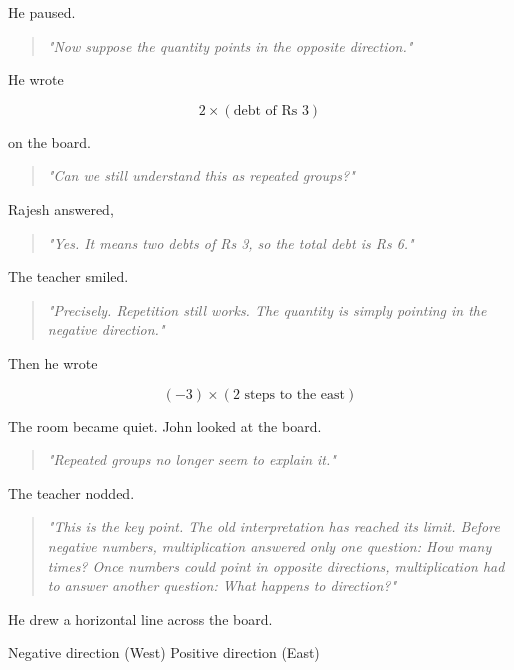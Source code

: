 \documentclass[11pt]{article}
\begin{document}
He paused.

\begin{quote}
\emph{"Now suppose the quantity points in the opposite direction."}
\end{quote}

He wrote

\[
2\times(\text{debt of Rs 3})
\]

on the board.

\begin{quote}
\emph{"Can we still understand this as repeated groups?"}
\end{quote}

Rajesh answered,

\begin{quote}
\emph{"Yes. It means two debts of Rs 3, so the total debt is Rs 6."}
\end{quote}

The teacher smiled.

\begin{quote}
\emph{"Precisely. Repetition still works. The quantity is simply pointing in the negative direction."}
\end{quote}

Then he wrote

\[
(-3)\times(\text{2 steps to the east})
\]

The room became quiet. John looked at the board.

\begin{quote}
\emph{"Repeated groups no longer seem to explain it."}
\end{quote}

The teacher nodded.

\begin{quote}
\emph{"This is the key point. The old interpretation has reached its limit. Before negative numbers, multiplication answered only one question: \emph{How many times?} Once numbers could point in opposite directions, multiplication had to answer another question: \emph{What happens to direction?}"}
\end{quote}

He drew a horizontal line across the board.

\begin{center}
Negative direction (West)\hspace{3cm} Positive direction (East)
\end{center}


\end{document}
